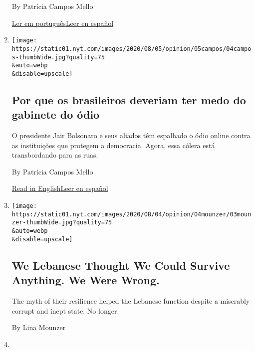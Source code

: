 \begin{enumerate}
  By Patrícia Campos Mello

  \href{https://www.nytimes.com/pt/2020/08/04/opinion/international-world/bolsonaro-gabinete-do-odio.html}{Ler
  em
  português}\href{https://www.nytimes.com/es/2020/08/04/espanol/opinion/bolsonaro-oficina-odio-brasil.html}{Leer
  en español}
\item
  \href{/pt/2020/08/04/opinion/international-world/bolsonaro-gabinete-do-odio.html}{}

  \texttt{[image: https://static01.nyt.com/images/2020/08/05/opinion/05campos/04campos-thumbWide.jpg?quality=75\\\&auto=webp\\\&disable=upscale]}

  \hypertarget{por-que-os-brasileiros-deveriam-ter-medo-do-gabinete-do-uxf3dio}{%
  \subsection{Por que os brasileiros deveriam ter medo do gabinete do
  ódio}\label{por-que-os-brasileiros-deveriam-ter-medo-do-gabinete-do-uxf3dio}}

  O presidente Jair Bolsonaro e seus aliados têm espalhado o ódio online
  contra as instituições que protegem a democracia. Agora, essa cólera
  está transbordando para as ruas.

  By Patrícia Campos Mello

  \href{https://www.nytimes.com/2020/08/04/opinion/bolsonaro-office-of-hate-brazil.html}{Read
  in
  English}\href{https://www.nytimes.com/es/2020/08/04/espanol/opinion/bolsonaro-oficina-odio-brasil.html}{Leer
  en español}
\item
  \href{/2020/08/03/opinion/lebanon-coronavirus-economy.html}{}

  \texttt{[image: https://static01.nyt.com/images/2020/08/04/opinion/04mounzer/03mounzer-thumbWide.jpg?quality=75\\\&auto=webp\\\&disable=upscale]}

  \hypertarget{we-lebanese-thought-we-could-survive-anything-we-were-wrong}{%
  \subsection{We Lebanese Thought We Could Survive Anything. We Were
  Wrong.}\label{we-lebanese-thought-we-could-survive-anything-we-were-wrong}}

  The myth of their resilience helped the Lebanese function despite a
  miserably corrupt and inept state. No longer.

  By Lina Mounzer
\item
  \href{/2020/08/02/opinion/hong-kong-election-china.html}{}


\end{enumerate}

